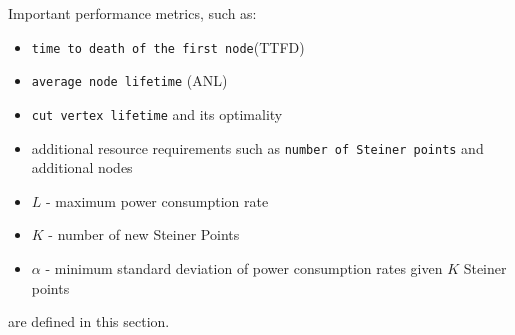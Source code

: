 Important performance metrics, such as:
\begin{itemize}
\item \texttt{time to death of the first node}(TTFD)
\item \texttt{average node lifetime} (ANL)
\item \texttt{cut vertex lifetime} and its optimality
\item additional resource requirements such as \texttt{number of Steiner points} and additional nodes
\item $L$ - maximum power consumption rate
\item $K$ - number of new Steiner Points
\item $\alpha$ - minimum standard deviation of power consumption rates given $K$ Steiner points
\end{itemize}
are defined in this section.